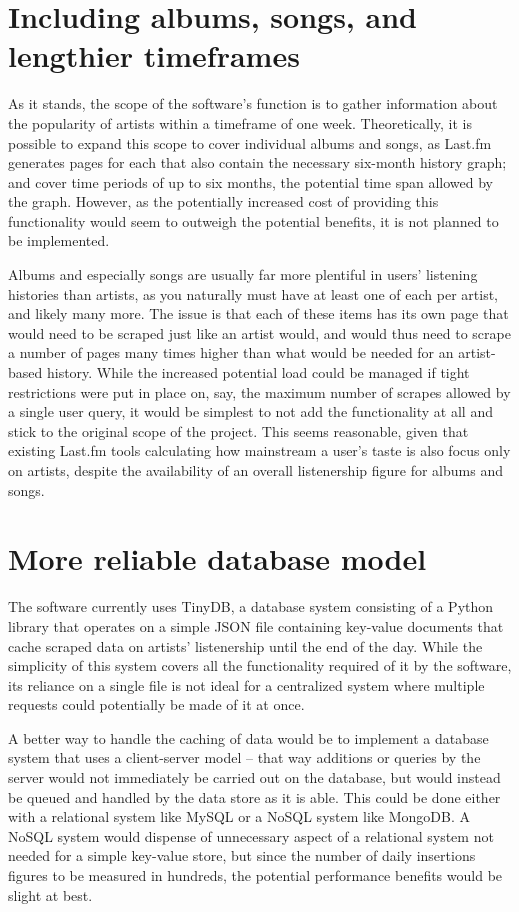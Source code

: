 \section{Including albums, songs, and lengthier timeframes}\label{months}

As it stands, the scope of the software's function is to gather information about the popularity of artists within a timeframe of one week. Theoretically, it is possible to expand this scope to cover individual albums and songs, as Last.fm generates pages for each that also contain the necessary six-month history graph; and cover time periods of up to six months, the potential time span allowed by the graph. However, as the potentially increased cost of providing this functionality would seem to outweigh the potential benefits, it is not planned to be implemented.

Albums and especially songs are usually far more plentiful in users' listening histories than artists, as you naturally must have at least one of each per artist, and likely many more. The issue is that each of these items has its own page that would need to be scraped just like an artist would, and would thus need to scrape a number of pages many times higher than what would be needed for an artist-based history. While the increased potential load could be managed if tight restrictions were put in place on, say, the maximum number of scrapes allowed by a single user query, it would be simplest to not add the functionality at all and stick to the original scope of the project. This seems reasonable, given that existing Last.fm tools calculating how mainstream a user's taste is also focus only on artists, despite the availability of an overall listenership figure for albums and songs.

\section{More reliable database model}\label{tinybad}

The software currently uses TinyDB, a database system consisting of a Python library that operates on a simple JSON file containing key-value documents that cache scraped data on artists' listenership until the end of the day. While the simplicity of this system covers all the functionality required of it by the software, its reliance on a single file is not ideal for a centralized system where multiple requests could potentially be made of it at once.

A better way to handle the caching of data would be to implement a database system that uses a client-server model -- that way additions or queries by the server would not immediately be carried out on the database, but would instead be queued and handled by the data store as it is able. This could be done either with a relational system like MySQL or a NoSQL system like MongoDB. A NoSQL system would dispense of unnecessary aspect of a relational system not needed for a simple key-value store, but since the number of daily insertions figures to be measured in hundreds, the potential performance benefits would be slight at best.

